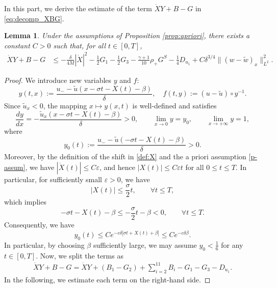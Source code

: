 \documentclass[11pt,reqno]{amsart}
\newtheorem{lemma}{Lemma}[section]
\numberwithin{equation}{section} %
\begin{document}
In this part, we derive the estimate of the term $\dot{X}Y+B-G$ in \eqref{eq:decomp_XBG}.

\begin{lemma} \label{lem:lead}
Under the assumptions of Proposition \ref{prop:apriori}, there exists a constant $C>0$ such that, for all $t \in [0,T]$,
 \begin{equation*}
        \begin{aligned}
            \dot{X}Y + B - G &\leq -\frac{\delta}{4M}|\dot{X}|^2   -\frac{1}{2}G_1- \frac{1}{2}G_3 -\frac{\gamma+1}{10}\rho_+G^S  - \frac{1}{4}D_{u_1}+C\delta^{3/4}\|(w-\tilde{w})_x\|_{L^2}^2.
        \end{aligned}
    \end{equation*}
\end{lemma}

\begin{proof}
   
We introduce new variables $y$ and $f$:
\begin{equation}\label{def:y_and_f}
	y(t,x):=\frac{u_--\tilde{u}(x-\sigma t-X(t)-\beta)}{\delta}, \quad f(t,y):=(u-\tilde{u})\circ y^{-1}.
\end{equation}
Since $\tilde{u}_x<0$, the mapping $x\mapsto y(x,t)$ is well-defined and satisfies
\[
\frac{dy}{dx} = -\frac{\tilde{u}_x(x-\sigma t - X(t) -\beta)}{\delta} >0,
\qquad
\lim_{x\to 0} y = y_0,
\qquad
\lim_{x\to +\infty} y = 1,
\]
where
\[
y_0(t):= \frac{u_--\tilde{u}(-\sigma t - X(t) - \beta)}{\delta} >0.
\]
Moreover, by the definition of the shift in \eqref{def:X} and the a priori assumption \eqref{p-assum}, we have $|\dot{X}(t)|\le C\varepsilon$, and hence $|X(t)|\le C\varepsilon t$ for all $0\le t\le T$. In particular, for sufficiently small $\varepsilon>0$, we have
\[
|X(t)|\le \frac{\sigma}{2}t,
\qquad
\forall  t\le T,
\]
which implies
\begin{equation}\label{small-X}
-\sigma t - X(t) - \beta \le -\frac{\sigma}{2}t - \beta < 0,
\qquad
\forall  t\le T.
\end{equation}
Consequently, we have
\[
y_0(t)\le Ce^{-c\delta|\sigma t + X(t) + \beta|} \le Ce^{-c\delta\beta}.
\]
In particular, by choosing $\beta$ sufficiently large, we may assume $y_0<\frac16$ for any $t\in [0,T]$. Now, we split the terms as
\begin{align*}
	\dot{X}Y+B-G = \dot{X}Y + (B_1-G_2) +\sum_{i=2}^{11}B_{i}-G_1-G_3-D_{u_1}.
\end{align*}
In the following, we estimate each term on the right-hand side.


\end{proof}
\end{document}
